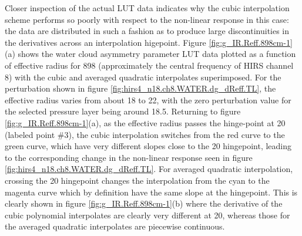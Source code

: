 Closer inspection of the actual LUT data indicates why the cubic interpolation scheme performs so poorly with respect to the non-linear response in this case: the data are distributed in such a fashion as to produce large discontinuities in the derivatives across an interpolation higepoint. Figure \ref{fig:g_IR.Reff.898cm-1}(a) shows the water cloud asymmetry parameter LUT data plotted as a function of effective radius for 898\invcm{} (approximately the central frequency of HIRS channel 8) with the cubic and averaged quadratic interpolates superimposed. For the perturbation shown in figure \ref{fig:hirs4_n18.ch8.WATER.dg_dReff.TL}, the effective radius varies from about 18 to 22\micron, with the zero perturbation value for the selected pressure layer being around 18.5\micron. Returning to figure \ref{fig:g_IR.Reff.898cm-1}(a), as the effective radius passes the hinge-point at 20\micron{} (labeled point \#3), the cubic interpolation switches from the red curve to the green curve, which have very different slopes close to the 20\micron{} hingepoint, leading to the corresponding change in the non-linear response seen in figure \ref{fig:hirs4_n18.ch8.WATER.dg_dReff.TL}. For averaged quadratic interpolation, crossing the 20\micron{} hingepoint changes the interpolation from the cyan to the magenta curve which by definition have the same slope at the hingepoint. This is clearly shown in figure \ref{fig:g_IR.Reff.898cm-1}(b) where the derivative of the cubic polynomial interpolates are clearly very different at 20\micron{}, whereas those for the averaged quadratic interpolates are piecewise continuous.

